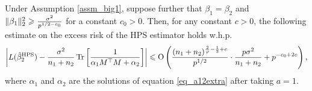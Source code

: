 \begin{corollary}\label{cor_hps_cov}
    Under Assumption \ref{assm_big1}, suppose further that $\beta_1 = \beta_2$ and $\|\beta_1\|^2_2 \geqslant \frac{\sigma^2}{p^{1/2 - c_0}}$ for a constant $c_0 > 0$.
    Then, for any constant $c > 0$, the following estimate on the excess risk of the HPS estimator holds w.h.p.
    \begin{align}
        \bigabs{L(\hat{\beta}_2^{\MTL}) - \frac{\sigma^2}{n_1 + n_2} \bigtr{\frac{1}{\alpha_1 M^{\top} M + \alpha_2}}}
        \le
        \OO\bigbrace{\frac{(n_1+n_2)^{\frac 2{\varphi} - \frac 1 2 + c}}{p^{1/2}}\cdot\frac{p \sigma^2}{n_1+ n_2}
        + p^{-c_0 + 2c}},
    \end{align}
    where $\alpha_1$ and $\alpha_2$ are the solutions of equation \eqref{eq_a12extra} after taking $a = 1$.
\end{corollary}


